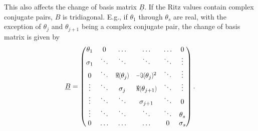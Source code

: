 \documentclass{scrartcl}
\numberwithin{equation}{section}
\begin{document}
This also affects the change of basis matrix $\underline{B}$. If the Ritz values contain complex conjugate pairs, $B$ is tridiagonal. E.g., if $\theta_1$ through $\theta_s$ are real, with the exception of $\theta_j$ and $\theta_{j + 1}$ being a complex conjugate pair, the change of basis matrix is given by
\begin{equation*}
\iffalse
\begin{matrix}
\ddots & \ddots & \ddots & \ddots & \\
& \sigma_{j - 1} & $\scalebox{.7}[1]{$\Re$(}$ \theta_j$\scalebox{.7}[1]{$)$}$ & $\scalebox{.7}[1]{$-\Im($}$\theta_j$\scalebox{.7}[1]{$)$}$^2 & \\
& 0 & \sigma_j & $\scalebox{.7}[1]{$\Re$(}$ \theta_{j + 1}$\scalebox{.7}[1]{$)$}$ & \\
& & 0 & \sigma_{j + 1} & \\
& & \ddots & \ddots & \ddots \\
\end{matrix}
\fi
\underline{B} =
\begin{pmatrix}
\theta_1 & 0 & \ldots & \ldots & \ldots & 0 \\
\sigma_1 & \ddots & \ddots & \ddots & \ddots & \vdots \\
0 & \ddots & $\scalebox{.7}[1]{$\Re$(}$ \theta_j$\scalebox{.7}[1]{$)$}$ & $\scalebox{.7}[1]{$-\Im($}$\theta_j$\scalebox{.7}[1]{$)$}$^2 & \ddots & \vdots \\
\vdots & \ddots & \sigma_j & $\scalebox{.7}[1]{$\Re$(}$ \theta_{j + 1}$\scalebox{.7}[1]{$)$}$ & \ddots & \vdots \\
\vdots & \ddots & \ddots & \sigma_{j + 1} & \ddots & 0 \\
\vdots & \ddots & \ddots & \ddots & \ddots & \theta_s \\
0 & \ldots & \ldots & \ldots & 0 & \sigma_s \\
\end{pmatrix}.
\end{equation*}
\end{document}
